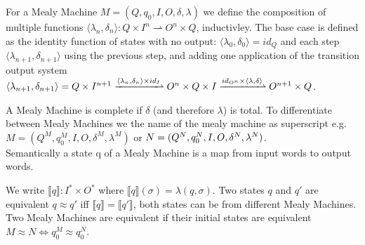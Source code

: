 \begin{definition}\label{def:composition}
 	For a Mealy Machine $M=(Q,q_0,I,O,\delta,\lambda)$ we define the composition of multiple functions $\langle\lambda_n,\delta_n\rangle:Q\times I^n\rightharpoonup O^n\times Q$, inductivley. The base case is defined as the identity function of states with no output: $\langle\lambda_0,\delta_0\rangle=id_Q$ and each step $\langle\lambda_{n+1},\delta_{n+1}\rangle$ using the previous step, and adding one application of the transition output system $\langle\lambda_{n+1},\delta_{n+1}\rangle =Q\times I^{n+1}\xrightharpoonup{\langle\lambda_n,\delta_n\rangle\times id_I}O^n\times Q\times I\xrightharpoonup{id_{O^n}\times\langle\lambda,\delta\rangle} O^{n+1}\times Q$.
 \end{definition} A Mealy Machine is complete if $\delta$ (and therefore $\lambda$) is total. To differentiate between Mealy Machines we the name of the mealy machine as superscript e.g. $M=(Q^M,q_0^M,I,O,\delta^M,\lambda^M)$ or $N=(Q^N,q_0^N,\linebreak I,O,\delta^N,\lambda^N)$.\\
Semantically a state q of a Mealy Machine is a map from input words to output words. 
\begin{definition}\label{definition:semantics}
	 We write $\llbracket q\rrbracket:I^*\times O^*$ where $\llbracket q\rrbracket(\sigma)=\lambda(q,\sigma)$. Two states $q$ and $q'$ are equivalent $q\approx q'$ iff $\llbracket q\rrbracket=\llbracket q' \rrbracket$, both states can be from different Mealy Machines. Two Mealy Machines are equivalent if their initial states are equivalent $M\approx N\iff q_0^M\approx q_0^N$.
\end{definition}
